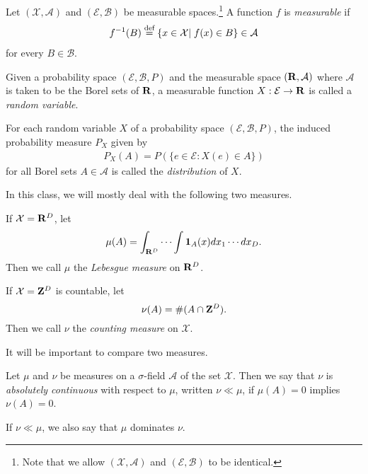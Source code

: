 \documentclass[twoside]{article}
\newcommand{\defeq}{\buildrel \text{d{}ef}\over =}
\begin{document}
\begin{definition}\label{def:measurable_function}\citep[Def. 1.7, p.~4]{keener}
Let $(\mathcal X, \mathcal A)$ and $(\mathcal E, \mathcal B)$ be measurable
spaces.\footnote{Note that we allow $(\mathcal X, \mathcal A)$ and
$(\mathcal E, \mathcal B)$ to be identical.}  A function $f$ is
\emph{measurable} if
\begin{align*}
f^{-1}(B) \defeq \{ x\in \mathcal X |\; f(x) \in B \} \in \mathcal A
\end{align*}
for every $B \in  \mathcal B$.
\end{definition}

\begin{definition}\label{def:random_variable}
Given a probability space $(\mathcal E, \mathcal B, P)$ and the measurable
space $(\mathbf{R}, \mathcal A)$ where $\mathcal A$ is taken to be the Borel
sets of $\mathbf{R}$, a measurable function $X : \mathcal E  \rightarrow \mathbf{R}$
is called a \emph{random variable}.
\end{definition}

For each random variable $X$ of a probability space $(\mathcal E, \mathcal B, P)$,
the induced probability measure $P_X$ given by
\begin{align*}
P_X(A) = P(\{e \in \mathcal E: X(e) \in A\}) 
\end{align*}
for all Borel sets $A \in  \mathcal A$ is called the \emph{distribution} of $X$.


In this class, we will mostly deal with the following two measures.
\begin{example} 
 If $\mathcal X = \mathbf{R}^D$, let
    \[ \mu(A) = \int_{\mathbf{R}^D} \cdots \int \mathbf{1}_A(x) dx_1 \cdots dx_D. \]
  Then we call $\mu$ the \emph{Lebesgue measure} on $\mathbf{R}^D$.
\end{example}
\begin{example} 
  If $\mathcal X = \mathbf{Z}^D$ is countable, let
    \[ \nu(A) = \#(A \cap \mathbf{Z}^D). \]
  Then we call $\nu$ the \emph{counting measure} on $\mathcal X$.
\end{example}

It will be important to compare two measures.

\begin{definition}\label{def:absolutecontinuity}\citep[Def. 1.9, p.~7]{keener}
  Let $\mu$ and $\nu$ be measures on a $\sigma$-field $\mathcal A$ of the
  set $\mathcal X$. Then we say that $\nu$ is \emph{absolutely continuous} with
  respect to $\mu$, written $\nu \ll \mu$, if
  $\mu(A) = 0$ implies $\nu(A) = 0$.
\end{definition}
If $\nu \ll \mu$, we also say that $\mu$ dominates $\nu$.
\end{document}
